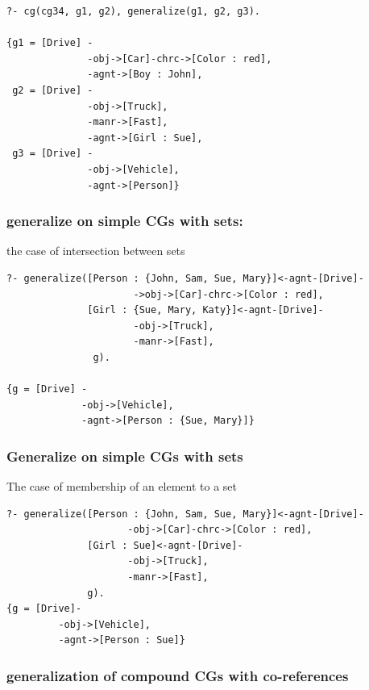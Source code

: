 \documentclass{book}
\begin{document}
\begin{verbatim}
?- cg(cg34, g1, g2), generalize(g1, g2, g3).

{g1 = [Drive] -
              -obj->[Car]-chrc->[Color : red],
              -agnt->[Boy : John], 
 g2 = [Drive] -
              -obj->[Truck],
              -manr->[Fast],
              -agnt->[Girl : Sue], 
 g3 = [Drive] -
              -obj->[Vehicle],
              -agnt->[Person]}
\end{verbatim}


\subsubsection{generalize on simple CGs with sets:} 

the case of intersection between sets


\begin{verbatim}
?- generalize([Person : {John, Sam, Sue, Mary}]<-agnt-[Drive]-
                      ->obj->[Car]-chrc->[Color : red],
              [Girl : {Sue, Mary, Katy}]<-agnt-[Drive]-
                      -obj->[Truck],
                      -manr->[Fast],
               g).

{g = [Drive] -
             -obj->[Vehicle],
             -agnt->[Person : {Sue, Mary}]}
\end{verbatim}



\subsubsection{Generalize on simple CGs with sets}

The case of membership of an element to a set

\begin{verbatim}
?- generalize([Person : {John, Sam, Sue, Mary}]<-agnt-[Drive]-
                     -obj->[Car]-chrc->[Color : red],
              [Girl : Sue]<-agnt-[Drive]- 
                     -obj->[Truck],
                     -manr->[Fast], 
              g).  
{g = [Drive]- 
         -obj->[Vehicle],
         -agnt->[Person : Sue]}
\end{verbatim}





\subsubsection{generalization of compound CGs with co-references}
\end{document}
